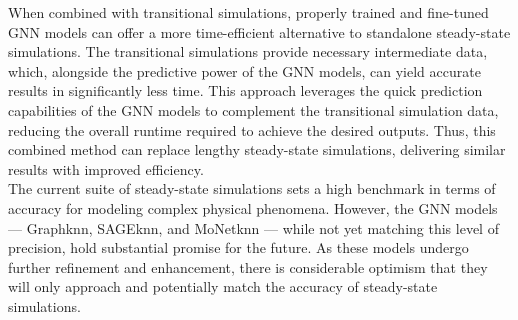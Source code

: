 When combined with transitional simulations, properly trained and fine-tuned GNN models can offer a more time-efficient alternative to standalone steady-state simulations. The transitional simulations provide necessary intermediate data, which, alongside the predictive power of the GNN models, can yield accurate results in significantly less time. This approach leverages the quick prediction capabilities of the GNN models to complement the transitional simulation data, reducing the overall runtime required to achieve the desired outputs. Thus, this combined method can replace lengthy steady-state simulations, delivering similar results with improved efficiency.\\
The current suite of steady-state simulations sets a high benchmark in terms of accuracy for modeling complex physical phenomena. However, the GNN models — Graphknn, SAGEknn, and MoNetknn — while not yet matching this level of precision, hold substantial promise for the future. As these models undergo further refinement and enhancement, there is considerable optimism that they will only approach and potentially match the accuracy of steady-state simulations.\\




